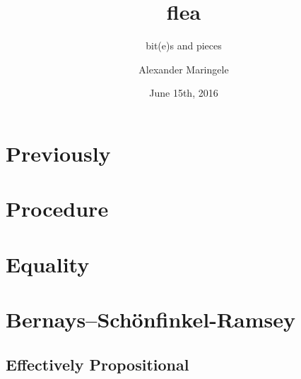 



\author{Alexander Maringele}
\title{flea\\
}
\subtitle{bit(e)s and pieces}
\date{June 15th, 2016}

%



 



\frame{
	\setcounter{tocdepth}{1}
	\tableofcontents}

%

%


\section{Previously}



\section{Procedure}



\section{Equality}



\section{Bernays–Schönfinkel-Ramsey}

\subsection{Effectively Propositional}

